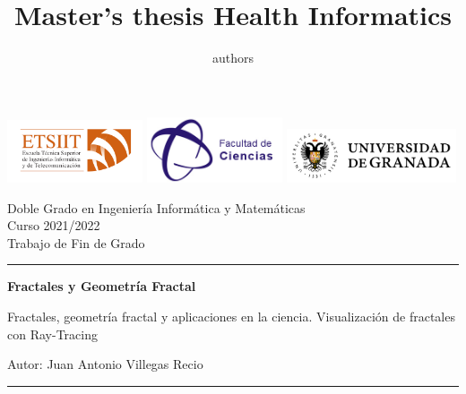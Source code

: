 \documentclass[11pt]{report}
\title{Master's thesis Health Informatics \the\year}
\author{authors}
\begin{document}
\renewcommand{\figurename}{Imagen}
\renewcommand{\listfigurename}{Lista de Imágenes}


\thispagestyle{empty}
\begin{titlepage}
    \hspace{-1.5cm}
	\includegraphics[width=40mm]{img/LogoETSIIT.png}
	\includegraphics[width=40mm]{img/LogoFacultadCiencias.jpeg}
	\hfill
	\includegraphics[width=50mm]{img/LogoUGR.png}
	
	\noindent\begin{small} \sffamily
		\begin{minipage}{0.65\textwidth}
			Doble Grado en Ingeniería Informática y Matemáticas\\
			Curso 2021/2022\\
			Trabajo de Fin de Grado\\
		\end{minipage}
	\hrule
	\end{small}

	\vspace{1cm}
	{\LARGE\noindent \textbf{Fractales y Geometría Fractal} \par}
	\vspace{0.5cm}
	{\Large\noindent Fractales, geometría fractal y aplicaciones en la ciencia. Visualización de fractales con Ray-Tracing \par}
	\vspace{2cm}
	{\LARGE\noindent Autor: Juan Antonio Villegas Recio \par} %

	\vfill
		
	\hrule
	\vspace{0.3cm}
	

\end{titlepage}
\end{document}
